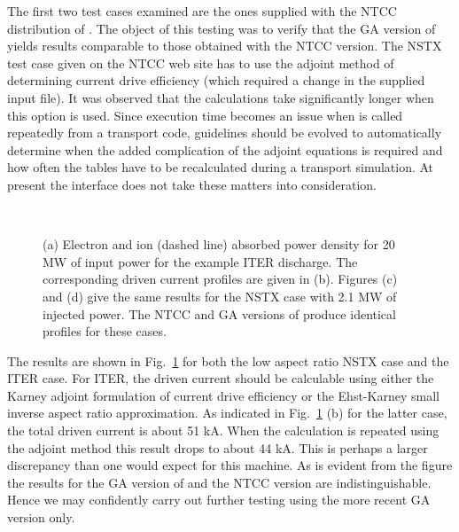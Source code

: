  The first two test cases examined are the ones supplied with the
 NTCC distribution of \ct. The object of this testing was to verify
 that the GA version of \ct yields results comparable to those
 obtained with the NTCC version. The NSTX test case given on the 
 NTCC web site 
 \cite{b2}
 has to use  the adjoint method of determining current drive
 efficiency  (which required a change in the supplied input file).
 It was observed that 
 the calculations take significantly longer when this option is used.
 Since execution  time becomes an 
 issue when \ct is called repeatedly from  a transport code,
 guidelines should be evolved to automatically determine when
 the added complication of the adjoint equations is required and how
 often the tables have to be recalculated during a transport
 simulation. At present the \ot interface does not take these matters
 into consideration.
 
 \begin{figure} %
 \centering    
\begin{narrow}{-.50in}{0in}  
 \mbox{}
    \\[20pt]
 \mbox{}
 \end{narrow}
 \caption{ (a) Electron and ion (dashed line)  absorbed power density for 20 MW of input
  power for the example ITER discharge. The corresponding driven current profiles are
  given in (b). Figures (c) and (d) give the same results for the NSTX
  case with 2.1 MW of injected power. The NTCC  and GA versions of
  \ct produce identical profiles for these cases. } 
  \label{Figbwav1a} 
 \end{figure}
 The results are shown in Fig.~\ref{Figbwav1a} for both the low aspect
 ratio NSTX case and the ITER case.  For ITER,  the driven current
 should be calculable using  either the Karney adjoint
 formulation of current drive efficiency or the Ehst-Karney small inverse
 aspect ratio approximation. As indicated in
 Fig.~\ref{Figbwav1a} (b) for the latter case, the total driven current
 is about 51 kA. When the calculation is repeated using the adjoint
 method this result drops to about 44 kA. This is perhaps a larger
 discrepancy than  one would expect for this machine.  As is evident from the
 figure  the results for the GA version of \ct and the
 NTCC version are indistinguishable. Hence we may confidently carry
 out further testing  using the more recent GA version only.

